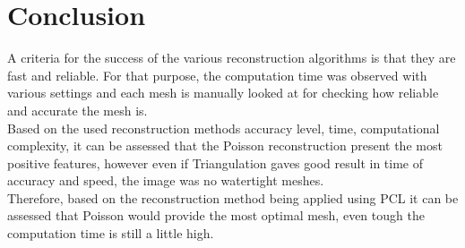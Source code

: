 \documentclass[paper=a4, fontsize=11pt]{scrartcl}	%
\numberwithin{equation}{section}															%
\numberwithin{figure}{section}																%
\numberwithin{table}{section}																%
\begin{document}
\section{Conclusion}
A criteria for the success of the various reconstruction algorithms is that they are fast and reliable. For that purpose, the computation time was observed  with various settings and each mesh is manually looked at for checking how reliable and accurate the mesh is.\\
Based on the used reconstruction methods accuracy level, time, computational complexity, it can be assessed that the Poisson reconstruction present the most positive features, however even if  Triangulation gaves good result in time of accuracy and speed, the image was no watertight meshes.\\
Therefore, based on the reconstruction method being applied using PCL it
can be assessed that Poisson would provide the most optimal mesh, even tough the computation time is still a little high.
\end{document}
